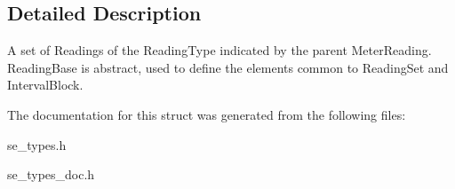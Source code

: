 \subsection{Detailed Description}
A set of Readings of the Reading\+Type indicated by the parent Meter\+Reading. Reading\+Base is abstract, used to define the elements common to Reading\+Set and Interval\+Block. 

The documentation for this struct was generated from the following files\+:\begin{DoxyCompactItemize}
\item 
se\+\_\+types.\+h\item 
se\+\_\+types\+\_\+doc.\+h\end{DoxyCompactItemize}
